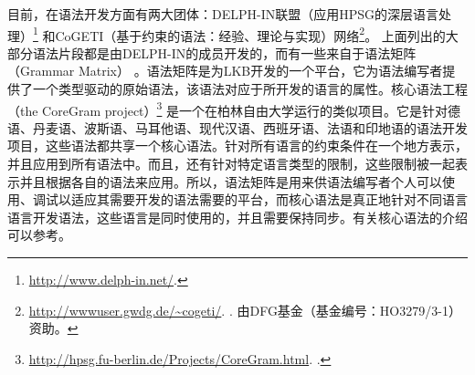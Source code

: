 目前，在语法开发方面有两大团体：DELPH-IN联盟（应用HPSG的深层语言处理）\footnote{
  \url{http://www.delph-in.net/}. 
} 和CoGETI（基于约束的语法：经验、理论与实现）网络\footnote{
\url{http://wwwuser.gwdg.de/~cogeti/}. . 由DFG基金（基金编号：HO3279/3-1）资助。}。
上面列出的大部分语法片段都是由DELPH-IN的成员开发的，而有一些来自于语法矩阵（Grammar Matrix） 。语法矩阵是为LKB开发的一个平台，它为语法编写者提供了一个类型驱动的原始语法，该语法对应于所开发的语言的属性\citep*{BFO2002a-u}。核心语法工程（the CoreGram project）\footnote{\url{http://hpsg.fu-berlin.de/Projects/CoreGram.html}. \mytoday.
} 是一个在柏林自由大学运行的类似项目。它是针对德语、丹麦语、波斯语、马耳他语、现代汉语、西班牙语、法语和印地语的语法开发项目，这些语法都共享一个核心语法。针对所有语言的约束条件在一个地方表示，并且应用到所有语法中。而且，还有针对特定语言类型的限制，这些限制被一起表示并且根据各自的语法来应用。所以，语法矩阵是用来供语法编写者个人可以使用、调试以适应其需要开发的语法需要的平台，而核心语法是真正地针对不同语言语言开发语法，这些语言是同时使用的，并且需要保持同步。有关核心语法的介绍可以参考。

